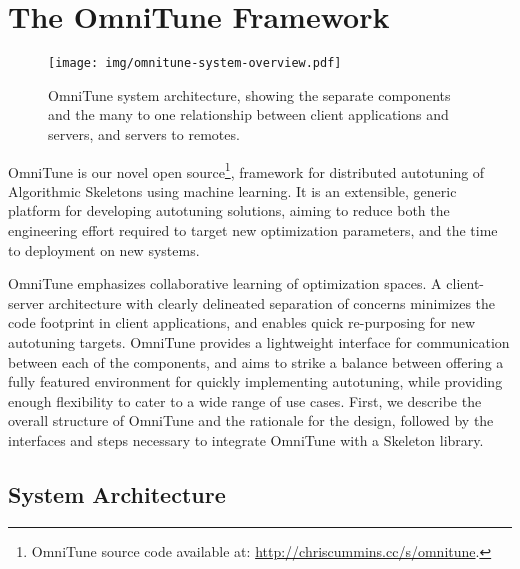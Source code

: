   \section{The OmniTune Framework}\label{sec:autotune}

  \begin{figure}
    \centering
    \texttt{[image: img/omnitune-system-overview.pdf]}
    \caption{%
    OmniTune system architecture, showing the separate components and
    the many to one relationship between client applications and
    servers, and servers to remotes.%
    }
    \label{fig:omnitune-system-overview}
  \end{figure}

  OmniTune is our novel open source\footnote{OmniTune source code available
  at: \url{http://chriscummins.cc/s/omnitune}.}, framework for
  distributed autotuning of Algorithmic Skeletons using machine
  learning. It is an extensible, generic platform for developing
  autotuning solutions, aiming to reduce both the engineering effort
  required to target new optimization parameters, and the time to
  deployment on new systems.

  OmniTune emphasizes collaborative learning of optimization spaces. A
  client-server architecture with clearly delineated separation of
  concerns minimizes the code footprint in client applications, and enables
  quick re-purposing for new autotuning targets. OmniTune provides a
  lightweight interface for communication between each of the
  components, and aims to strike a balance between offering a fully
  featured environment for quickly implementing autotuning, while
  providing enough flexibility to cater to a wide range of use
  cases. First, we describe the overall structure of OmniTune and the
  rationale for the design, followed by the interfaces and steps
  necessary to integrate OmniTune with a Skeleton library.


  \subsection{System Architecture}


